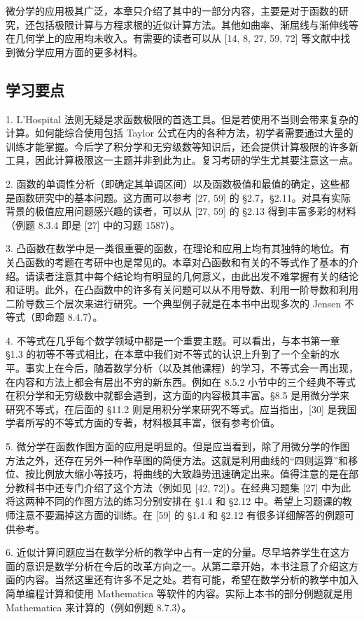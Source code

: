 微分学的应用极其广泛，本章只介绍了其中的一部分内容，主要是对于函数的研究，还包括极限计算与方程求根的近似计算方法。其他如曲率、渐屈线与渐伸线等在几何学上的应用均未收入。有需要的读者可以从 [14, 8, 27, 59, 72] 等文献中找到微分学应用方面的更多材料。

\subsection{学习要点}

1. L'Hospital 法则无疑是求函数极限的首选工具。但是若使用不当则会带来复杂的计算。如何能综合使用包括 Taylor 公式在内的各种方法，初学者需要通过大量的训练才能掌握。今后学了积分学和无穷级数等知识后，还会提供计算极限的许多新工具，因此计算极限这一主题并非到此为止。复习考研的学生尤其要注意这一点。

2. 函数的单调性分析（即确定其单调区间）以及函数极值和最值的确定，这些都是函数研究中的基本问题。这方面可以参考 [27, 59] 的 §2.7，§2.11。对具有实际背景的极值应用问题感兴趣的读者，可以从 [27, 59] 的 §2.13 得到丰富多彩的材料（例题 8.3.4 即是 [27] 中的习题 1587）。

3. 凸函数在数学中是一类很重要的函数，在理论和应用上均有其独特的地位。有关凸函数的考题在考研中也是常见的。本章对凸函数和有关的不等式作了基本的介绍。请读者注意其中每个结论均有明显的几何意义，由此出发不难掌握有关的结论和证明。此外，在凸函数中的许多有关问题可以从不用导数、利用一阶导数和利用二阶导数三个层次来进行研究。一个典型例子就是在本书中出现多次的 Jensen 不等式（即命题 8.4.7）。

4. 不等式在几乎每个数学领域中都是一个重要主题。可以看出，与本书第一章 §1.3 的初等不等式相比，在本章中我们对不等式的认识上升到了一个全新的水平。事实上在今后，随着数学分析（以及其他课程）的学习，不等式会一再出现，在内容和方法上都会有层出不穷的新东西。例如在 8.5.2 小节中的三个经典不等式在积分学和无穷级数中就都会遇到，这方面的内容极其丰富。§8.5 是用微分学来研究不等式，在后面的 §11.2 则是用积分学来研究不等式。应当指出，[30] 是我国学者所写的不等式方面的专著，材料极其丰富，很有参考价值。

5. 微分学在函数作图方面的应用是明显的。但是应当看到，除了用微分学的作图方法之外，还存在另外一种作草图的简便方法。这就是利用曲线的“四则运算”和移位、按比例放大缩小等技巧，将曲线的大致趋势迅速确定出来。值得注意的是在部分教科书中还专门介绍了这个方法（例如见 [42, 72]）。在经典习题集 [27] 中为此将这两种不同的作图方法的练习分别安排在 §1.4 和 §2.12 中。希望上习题课的教师注意不要漏掉这方面的训练。在 [59] 的 §1.4 和 §2.12 有很多详细解答的例题可供参考。

6. 近似计算问题应当在数学分析的教学中占有一定的分量。尽早培养学生在这方面的意识是数学分析在今后的改革方向之一。从第二章开始，本书注意了介绍这方面的内容。当然这里还有许多不足之处。若有可能，希望在数学分析的教学中加入简单编程计算和使用 Mathematica 等软件的内容。实际上本书的部分例题就是用 Mathematica 来计算的（例如例题 8.7.3）。

